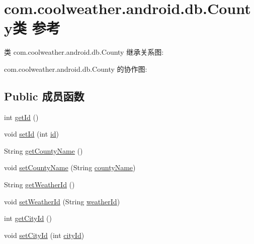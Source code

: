 \hypertarget{classcom_1_1coolweather_1_1android_1_1db_1_1_county}{}\section{com.\+coolweather.\+android.\+db.\+County类 参考}
\label{classcom_1_1coolweather_1_1android_1_1db_1_1_county}


类 com.\+coolweather.\+android.\+db.\+County 继承关系图\+:


com.\+coolweather.\+android.\+db.\+County 的协作图\+:
\subsection*{Public 成员函数}
\begin{DoxyCompactItemize}
\item 
int \mbox{\hyperlink{classcom_1_1coolweather_1_1android_1_1db_1_1_county_ae78dfbba056dace160b7755195d9dc71}{get\+Id}} ()
\item 
void \mbox{\hyperlink{classcom_1_1coolweather_1_1android_1_1db_1_1_county_afcd09651034f2ac6cf4bc7a674a30ebb}{set\+Id}} (int \mbox{\hyperlink{classcom_1_1coolweather_1_1android_1_1db_1_1_county_a403abab6be77b743e58d126fa5ed78b5}{id}})
\item 
String \mbox{\hyperlink{classcom_1_1coolweather_1_1android_1_1db_1_1_county_a1de2cbf5aa040b58853f2b77fa2d5805}{get\+County\+Name}} ()
\item 
void \mbox{\hyperlink{classcom_1_1coolweather_1_1android_1_1db_1_1_county_a80d7c937e8e4e13ab4b993be7947b16b}{set\+County\+Name}} (String \mbox{\hyperlink{classcom_1_1coolweather_1_1android_1_1db_1_1_county_a0f7eb4416897c5c758d145121d6c30cd}{county\+Name}})
\item 
String \mbox{\hyperlink{classcom_1_1coolweather_1_1android_1_1db_1_1_county_a2585933a896b7dd474529507cb1b1de2}{get\+Weather\+Id}} ()
\item 
void \mbox{\hyperlink{classcom_1_1coolweather_1_1android_1_1db_1_1_county_a4e8426dbd862f0a427829c43056d5851}{set\+Weather\+Id}} (String \mbox{\hyperlink{classcom_1_1coolweather_1_1android_1_1db_1_1_county_a6e7a184e8028098a75c67768b10ab6d3}{weather\+Id}})
\item 
int \mbox{\hyperlink{classcom_1_1coolweather_1_1android_1_1db_1_1_county_a6c22ae34e236d4036a88b542f045f1f6}{get\+City\+Id}} ()
\item 
void \mbox{\hyperlink{classcom_1_1coolweather_1_1android_1_1db_1_1_county_a29288f51c591ee1a1dee2268a472ba71}{set\+City\+Id}} (int \mbox{\hyperlink{classcom_1_1coolweather_1_1android_1_1db_1_1_county_a3b2b5d74078fa6a7c3c4b31d526816d5}{city\+Id}})
\end{DoxyCompactItemize}
